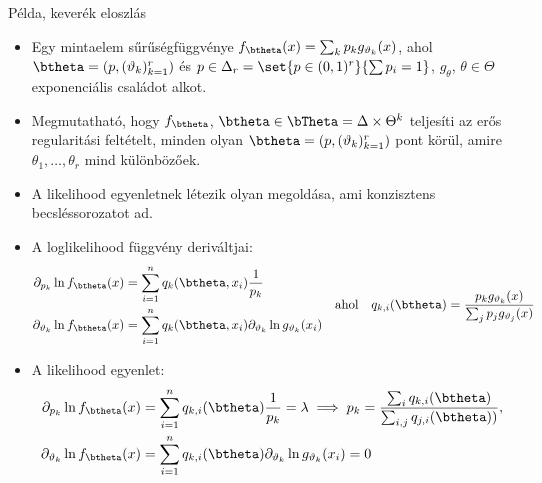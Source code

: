 \documentclass[aspectratio=169,notheorems,9pt,\option]{beamer}
\begin{document}
\begin{frame}{Példa, keverék eloszlás}
  \begin{itemize}
    \item Egy mintaelem sűrűségfüggvénye $f_{\btheta}(x)=\sum_k p_k g_{\theta_k}(x)$, ahol 
    $\btheta=(p,(\theta_k)_{k=1}^r)$ és $p\in\Delta_r=\set{p\in (0,1)^r}{\sum p_i=1}$, 
    $g_{\theta}$, $\theta\in\Theta$ exponenciális családot alkot. 
    \item Megmutatható, hogy $f_\btheta$, $\btheta\in\bTheta=\Delta\times\Theta^k$ 
    teljesíti az erős regularitási feltételt, minden olyan $\btheta=(p,(\theta_k)_{k=1}^r)$ pont körül, amire 
    $\theta_1,\dots,\theta_r$ mind különbözőek.
    \item A likelihood egyenletnek létezik olyan megoldása, ami konzisztens becsléssorozatot ad.
    \item A loglikelihood függvény deriváltjai:
    \begin{displaymath}  
    \begin{aligned}
      \partial_{p_k} \ln f_{\btheta}(x) & =\sum_{i=1}^n q_k(\btheta, x_i) \frac1{p_k}\\
      \partial_{\theta_k} \ln f_{\btheta}(x) & =\sum_{i=1}^n q_k(\btheta, x_i) \partial_{\theta_k} \ln g_{\theta_k}(x_i)
    \end{aligned}
    \quad\text{ahol}\quad
    q_{k,i}(\btheta) = \frac{p_k g_{\theta_k}(x)}{\sum_j p_j g_{\theta_j}(x)}
    \end{displaymath}
    \item A likelihood egyenlet:
    \begin{align*}
      \partial_{p_k} \ln f_{\btheta}(x) & =\sum_{i=1}^n q_{k,i}(\btheta) \frac1{p_k}=\lambda 
      \implies p_k = \frac{\sum_{i} q_{k,i}(\btheta)}{\sum_{i,j} q_{j,i}(\btheta))} ,
      \\
      \partial_{\theta_k} \ln f_{\btheta}(x) & =\sum_{i=1}^n q_{k,i}(\btheta) \partial_{\theta_k} \ln g_{\theta_k}(x_i)=0
    \end{align*}
  \end{itemize}
\end{frame}
\end{document}
